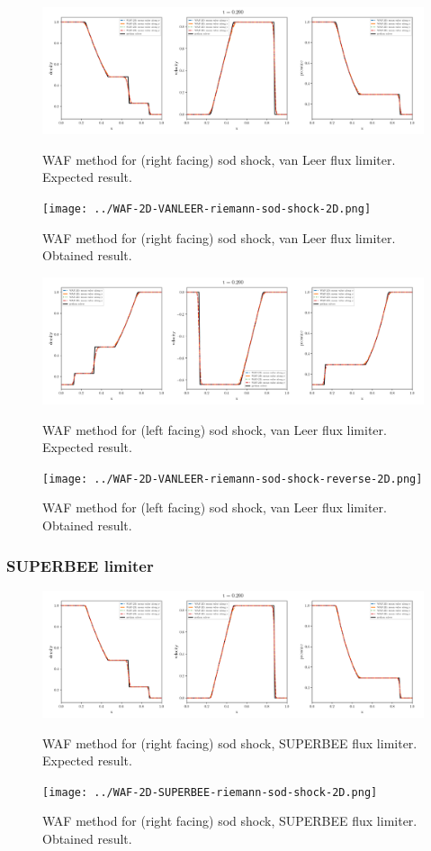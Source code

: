     \begin{figure}[htbp]
        \centering
        \includegraphics[width=.9\textwidth]{./figures/WAF-2D-VANLEER-riemann-sod-shock-2D.png}%
        \caption{WAF method for (right facing) sod shock, van Leer flux limiter. Expected result.}
        \texttt{[image: ../WAF-2D-VANLEER-riemann-sod-shock-2D.png]}%
        \caption{WAF method for (right facing) sod shock, van Leer flux limiter. Obtained result.}
    \end{figure}


    \begin{figure}[htbp]
        \centering
        \includegraphics[width=.9\textwidth]{./figures/WAF-2D-VANLEER-riemann-sod-shock-reverse-2D.png}%
        \caption{WAF method for (left facing) sod shock, van Leer flux limiter. Expected result.}
        \texttt{[image: ../WAF-2D-VANLEER-riemann-sod-shock-reverse-2D.png]}%
        \caption{WAF method for (left facing) sod shock, van Leer flux limiter. Obtained result.}
    \end{figure}






\clearpage
\subsubsection{SUPERBEE limiter}

    \begin{figure}[htbp]
        \centering
        \includegraphics[width=.9\textwidth]{./figures/WAF-2D-SUPERBEE-riemann-sod-shock-2D.png}%
        \caption{WAF method for (right facing) sod shock, SUPERBEE flux limiter. Expected result.}
        \texttt{[image: ../WAF-2D-SUPERBEE-riemann-sod-shock-2D.png]}%
        \caption{WAF method for (right facing) sod shock, SUPERBEE flux limiter. Obtained result.}
    \end{figure}


